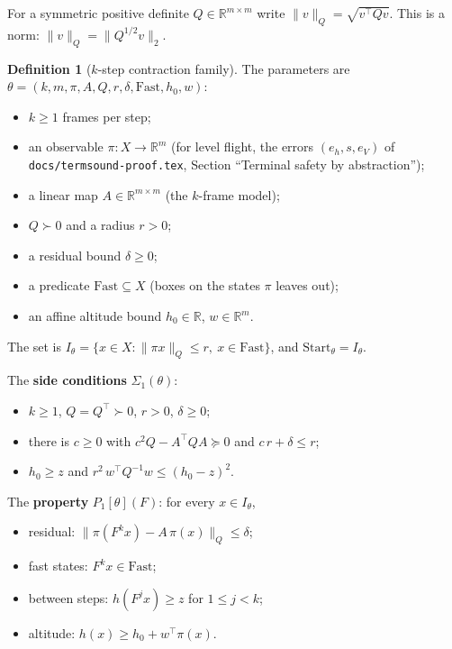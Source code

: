 \documentclass[11pt]{article}
\theoremstyle{definition}
\newtheorem{definition}[theorem]{Definition}
\newcommand{\R}{\mathbb{R}}
\newcommand{\Fast}{\ensuremath{\mathrm{Fast}}}
\newcommand{\Start}{\ensuremath{\mathrm{Start}}}
\newcommand{\nQ}[1]{\|#1\|_Q}
\begin{document}
For a symmetric positive definite $Q \in \R^{m \times m}$ write $\nQ{v} = \sqrt{v^\top Q v}$. This is a norm: $\nQ{v} = \|Q^{1/2} v\|_2$.

\begin{definition}[$k$-step contraction family]\label{def:k}
The parameters are $\theta = (k, m, \pi, A, Q, r, \delta, \Fast, h_0, w)$:
\begin{itemize}
\item $k \ge 1$ frames per step;
\item an observable $\pi : X \to \R^m$ (for level flight, the errors $(e_h, s, e_V)$ of \texttt{docs/termsound-proof.tex}, Section ``Terminal safety by abstraction'');
\item a linear map $A \in \R^{m \times m}$ (the $k$-frame model);
\item $Q \succ 0$ and a radius $r > 0$;
\item a residual bound $\delta \ge 0$;
\item a predicate $\Fast \subseteq X$ (boxes on the states $\pi$ leaves out);
\item an affine altitude bound $h_0 \in \R$, $w \in \R^m$.
\end{itemize}
The set is $I_\theta = \{x \in X : \nQ{\pi x} \le r,\ x \in \Fast\}$, and $\Start_\theta = I_\theta$.

The \textbf{side conditions} $\Sigma_1(\theta)$:
\begin{itemize}
\item[($\Sigma$a)] $k \ge 1$, $Q = Q^\top \succ 0$, $r > 0$, $\delta \ge 0$;
\item[($\Sigma$b)] there is $c \ge 0$ with $c^2 Q - A^\top Q A \succeq 0$ and $c\,r + \delta \le r$;
\item[($\Sigma$c)] $h_0 \ge z$ and $r^2\, w^\top Q^{-1} w \le (h_0 - z)^2$.
\end{itemize}
The \textbf{property} $P_1[\theta](F)$: for every $x \in I_\theta$,
\begin{itemize}
\item[(C1)] residual: $\nQ{\pi(F^k x) - A\,\pi(x)} \le \delta$;
\item[(C2)] fast states: $F^k x \in \Fast$;
\item[(C3)] between steps: $h(F^j x) \ge z$ for $1 \le j < k$;
\item[(C4)] altitude: $h(x) \ge h_0 + w^\top \pi(x)$.
\end{itemize}
\end{definition}
\end{document}
